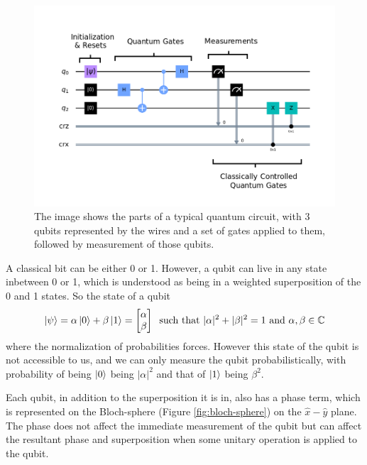 \begin{figure}[ht]
    \centering
    \includegraphics[width=0.8\linewidth]{figures/quantum/quantum_circuit_example.png}
    \caption[Typical Quantum Circuit]{The image shows the parts of a typical quantum circuit, with 3 qubits represented by the wires and a set of gates applied to them, followed by measurement of those qubits.}
    \label{fig:quantum-circuit-example}
\end{figure}


A classical bit can be either 0 or 1. However, a qubit can live in any state inbetween 0 or 1, which is understood as being in a weighted superposition of the 0 and 1 states. So the state of a qubit 
\begin{equation}
    \ket{\psi} = \alpha \ket{0} + \beta \ket{1} = \begin{bmatrix}\alpha \\ \beta\end{bmatrix} \;\;\text{such that }|\alpha|^2 + |\beta|^2 = 1 \text{ and } \alpha, \beta \in \mathbb{C}
\end{equation}
where the normalization of probabilities forces. However this state of the qubit is not accessible to us, and we can only measure the qubit probabilistically, with probability of being $\ket{0}$ being $|\alpha|^2$ and that of $\ket{1}$ being $\beta^2$.

Each qubit, in addition to the superposition it is in, also has a phase term, which is represented on the Bloch-sphere (Figure \ref{fig:bloch-sphere}) on the $\hat{x}-\hat{y}$ plane. The phase does not affect the immediate measurement of the qubit but can affect the resultant phase and superposition when some unitary operation is applied to the qubit.

